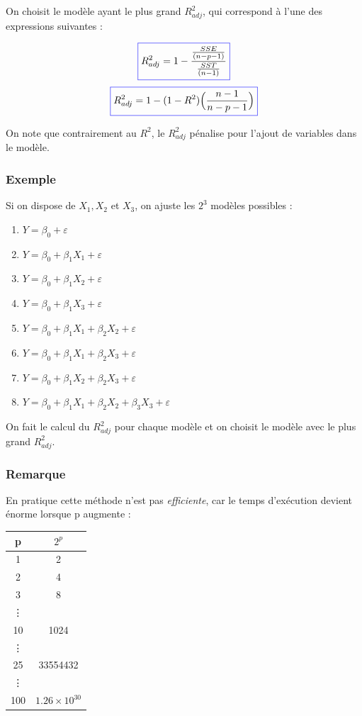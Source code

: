 \documentclass[11pt,french]{report}
\begin{document}
On choisit le modèle ayant le plus grand $R^2_{adj}$, qui correspond à l'une des expressions suivantes :

\begin{equation}
\color{blue}
\boxed{\color{black}
R^2_{adj} = 1 - \frac{\frac{SSE}{(n-p-1)}}{\frac{SST}{(n-1)}} 
}
\end{equation}
\begin{equation}
\color{blue}
\boxed{\color{black}
R^2_{adj} = 1 - (1 - R^2) \Big(\frac{n-1}{n-p-1} \Big) 
}
\end{equation}

On note que contrairement au $R^2$, le $R^2_{adj}$ pénalise pour l'ajout de variables dans le modèle.

\bigskip
\subsubsection*{Exemple}
Si on dispose de $X_1, X_2$ et $X_3$, on ajuste les $2^3$ modèles possibles :
\begin{enumerate}
\item $Y = \beta_0 + \varepsilon$
\item $Y = \beta_0 + \beta_1X_1 + \varepsilon$
\item $Y = \beta_0 + \beta_1X_2 + \varepsilon$
\item $Y = \beta_0 + \beta_1X_3 + \varepsilon$
\item $Y = \beta_0 + \beta_1X_1 + \beta_2X_2 + \varepsilon$
\item $Y = \beta_0 + \beta_1X_1 + \beta_2X_3 + \varepsilon$
\item $Y = \beta_0 + \beta_1X_2 + \beta_2X_3 + \varepsilon$
\item $Y = \beta_0 + \beta_1X_1 + \beta_2X_2 + \beta_3X_3 + \varepsilon$
\end{enumerate}
On fait le calcul du $R^2_{adj}$ pour chaque modèle et on choisit le modèle avec le plus grand $R^2_{adj}$.

\subsubsection*{Remarque}
En pratique cette méthode n'est pas \emph{efficiente}, car le temps d'exécution devient énorme lorsque p augmente :

\begin{center}
\begin{tabular}{|c|c|}
\hline
p & $2^p$ \\
\hline
1 & 2 \\
2 & 4 \\
3 & 8 \\
\vdots & \\
10 & 1024 \\
\vdots & \\
25 & 33554432 \\
\vdots & \\
100 & $1.26\times 10^{30}$ \\
\hline
\end{tabular}
\end{center}
\end{document}

